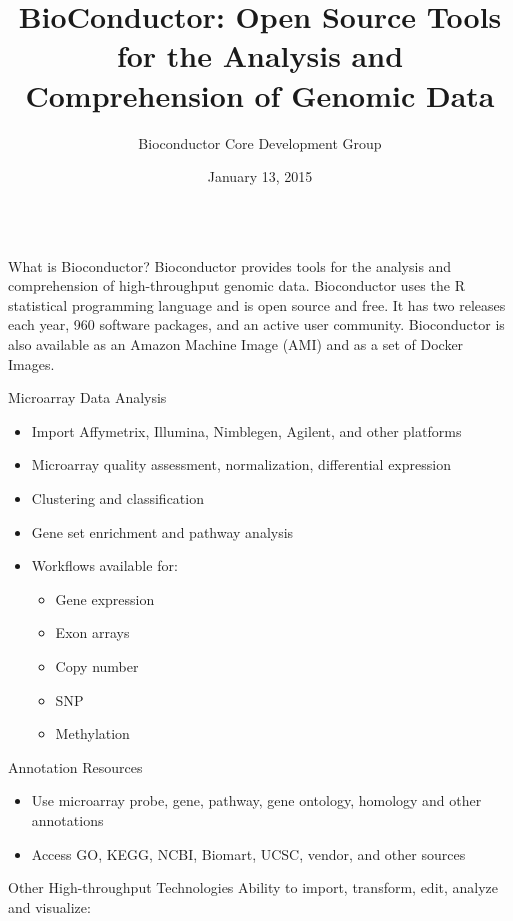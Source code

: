 \documentclass[final]{beamer}
\title{BioConductor:  Open Source Tools for the Analysis and Comprehension of Genomic Data}
\author{Bioconductor Core Development Group}
\date{January 13, 2015}
\begin{document}
\begin{frame}[t]
  \begin{columns}[t]
    \begin{column}{0.24\linewidth}
      \begin{block}{What is Bioconductor?}
        Bioconductor provides tools for the analysis and comprehension of high-throughput genomic data. Bioconductor uses the R statistical programming language and is open source and free. It has two releases each year, 960 software packages, and an active user community. Bioconductor is also available as an Amazon Machine Image (AMI) and as a set of Docker Images.
      \end{block}
      \begin{block}{Microarray Data Analysis}
        \begin{itemize}
        \item{Import Affymetrix, Illumina, Nimblegen, Agilent, and other platforms}
        \item{Microarray quality assessment, normalization, differential expression}
        \item{Clustering and classification}
        \item{Gene set enrichment and pathway analysis}
        \item{Workflows available for:}
     \begin{itemize}
       \item{Gene expression}
       \item{Exon arrays}
       \item{Copy number}
       \item{SNP}
       \item{Methylation}
     \end{itemize}
        \end{itemize}
      \end{block}
      \begin{block}{Annotation Resources}
        \begin{itemize}
          \item{Use microarray probe, gene, pathway, gene ontology, homology and other annotations} 
          \item{Access GO, KEGG, NCBI, Biomart, UCSC, vendor, and other sources}
        \end{itemize}
        \end{block}
      \begin{block}{Other High-throughput Technologies}
        Ability to import, transform, edit, analyze and visualize:

\end{block}
\end{column}
\end{columns}
\end{frame}
\end{document}
